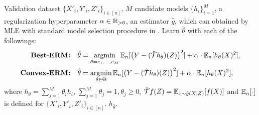 \begin{algorithm}[!t] \label{alg:model_selection}
\caption{Model Selection for Regularized Deep IV }
\begin{algorithmic}[1]\label{alg:model_selection}
        \REQUIRE Validation dataset $\{X'_i,Y'_i,Z'_i\}_{i\in[n]}$, $M$ candidate models $\{h_i\}_{i=1}^M$, a regularization hyperparameter $\alpha \in \mathbb{R}_{>0}$, an estimator $\hat g$, which can obtained by MLE with standard model selection procedure in \citet{MLEselection,conditiondensitySelection}. 
        \STATE   Learn $\hat \theta$ with each of the followings:  
        \begin{align}
  \textbf{Best-ERM:}\quad   {\hat \theta} &= \mathop{\mathrm{argmin}}_{\theta= e_1, \dots, e_M} \mathbb{E}_n[\big(Y - (\hat{{\mathcal{T}}} h_{\theta})(Z)\big)^2]+ \alpha \cdot \mathbb{E}_n[h_{\theta}(X)^2], \\
    \textbf{Convex-ERM:}\quad   \hat{\theta} & = \mathop{\mathrm{argmin}}_{\theta \in \Theta} \mathbb{E}_n[\big(Y - (\hat{{\mathcal{T}}} h_{\theta})(Z)\big)^2]+ \alpha \cdot \mathbb{E}_n[h_{\theta}(X)^2], 
    \end{align}
      where $h_\theta = \sum_{j=1}^M \theta_i h_i$, $\sum_{j=1}^M \theta_j =1, \theta_j\geq 0$, $\hat{{\mathcal{T}}} f(Z) = \mathbb{E}_{x\sim \hat{g}(X|Z)}[f(X)]$ and $\mathbb{E}_n[\cdot]$ is defined for $\{X'_i,Y'_i,Z'_i\}_{i \in [n]}$. 
    \OUTPUT $h_{\hat \theta}$.
\end{algorithmic}
\end{algorithm}


 

